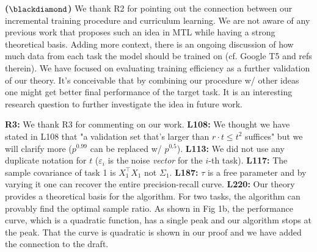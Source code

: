 \documentclass{article}
\begin{document}
\vspace{-0.045in}
\textbf{($\blackdiamond$)}  We thank R2 for pointing out the connection between our incremental training procedure and curriculum learning.
We are not aware of any previous work that proposes such an idea in MTL while having a strong theoretical basis.
Adding more context, there is an ongoing discussion of how much data from each task the model should be trained on (cf. Google T5 and refs therein).
We have focused on evaluating training efficiency as a further validation of our theory.
It's conceivable that by combining our procedure w/ other ideas one might get better final performance of the target task.
It is an interesting research question to further investigate the idea in future work.

\vspace{-0.025in}
\textbf{R3:}
We thank R3 for commenting on our work.
\textbf{L108:}
We thought we have stated in L108 that "a validation set that's larger than $r\cdot t \le t^2$ suffices" but we will clarify more ($p^{0.99}$ can be replaced w/ $p^{0.5}$).
\textbf{L113:} We did not use any duplicate notation for $t$ ($\varepsilon_i$ is the noise \textit{vector} for the $i$-th task).
\textbf{L117:} The sample covariance of task 1 is  $X_1^{\top}X_1$ not $\Sigma_1$.
\textbf{L187:} $\tau$ is a free parameter and by varying it one can recover the entire precision-recall curve.
\textbf{L220:} Our theory provides a theoretical basis for the algorithm.
For two tasks, the algorithm can provably find the optimal sample ratio. As shown in Fig 1b, the performance curve, which is a quadratic function, has a single peak and our algorithm stops at the peak.
That the curve is quadratic is shown in our proof and we have added the connection to the draft.
\end{document}
